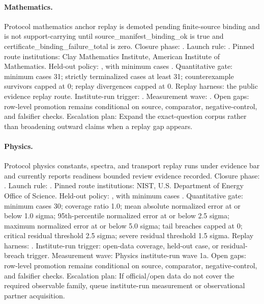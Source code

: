 \paragraph{Mathematics.}
Protocol mathematics anchor replay is demoted pending finite-source binding and is not support-carrying until source_manifest_binding_ok is true and certificate_binding_failure_total is zero.
Closure phase: . Launch rule: .
Pinned route institutions: Clay Mathematics Institute, \allowbreak American Institute of Mathematics.
Held-out policy: , with minimum cases .
Quantitative gate: minimum cases 31; strictly terminalized cases at least 31; counterexample survivors capped at 0; replay divergences capped at 0.
Replay harness: the public evidence replay route.
Institute-run trigger: . Measurement wave: .
Open gaps: row-level promotion remains conditional on source, comparator, negative-control, and falsifier checks.
Escalation plan: Expand the exact-question corpus rather than broadening outward claims when a replay gap appears.

\paragraph{Physics.}
Protocol physics constants, spectra, and transport replay runs under evidence bar  and currently reports readiness bounded review evidence recorded.
Closure phase: . Launch rule: .
Pinned route institutions: NIST, \allowbreak U.S. Department of Energy Office of Science.
Held-out policy: , with minimum cases .
Quantitative gate: minimum cases 30; coverage ratio 1.0; mean absolute normalized error at or below 1.0 sigma; 95th-percentile normalized error at or below 2.5 sigma; maximum normalized error at or below 5.0 sigma; tail breaches capped at 0; critical residual threshold 2.5 sigma; severe residual threshold 1.5 sigma.
Replay harness: .
Institute-run trigger: open-data coverage, held-out case, or residual-breach trigger. Measurement wave: Physics institute-run wave 1a.
Open gaps: row-level promotion remains conditional on source, comparator, negative-control, and falsifier checks.
Escalation plan: If official/open data do not cover the required observable family, queue institute-run measurement or observational partner acquisition.

